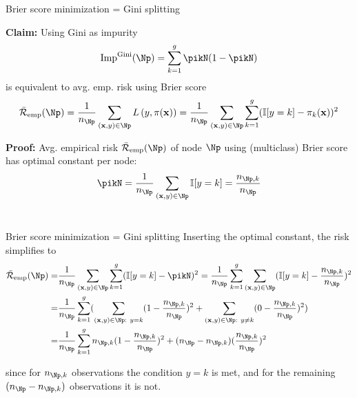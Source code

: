 \documentclass[11pt,compress,t,notes=noshow, xcolor=table]{beamer}
\begin{document}
\begin{frame}{Brier score minimization = Gini splitting}

\textbf{Claim:} Using Gini as impurity
$$\text{Imp}^{\text{Gini}}(\Np) = \sum_{k=1}^g \pikN (1-\pikN )$$
is equivalent to avg. emp. risk using Brier score 
$$\riskeb(\Np)= \frac{1}{n_\Np} \sum_{\xy \in \Np} \Lpixy = \frac{1}{n_\Np} \sum_{\xy \in \Np} \sum_{k = 1}^g (\I [y=k] - \pi_k(\xv))^2$$



\vfill

\textbf{Proof:} Avg. empirical risk $\riskeb(\Np)$ of node $\Np$ using (multiclass) Brier score has optimal constant per node: 
$$\pikN = \frac{1}{n_{\Np}} \sum\limits_{(\xv,y) \in \Np} \I [y=k] = \frac{n_{\Np,k}}{n_{\Np }}$$ \\

\vfill



\end{frame}
\begin{framev}[fs=small]{Brier score minimization = Gini splitting}
Inserting the optimal constant, the risk simplifies to
\begin{align*}
\riskeb(\Np) =& \frac{1}{n_\Np} \sum_{\xy \in \Np}  \sum_{k = 1}^g (\I [y=k] - \pikN)^2 
= \frac{1}{n_\Np} \sum_{k = 1}^g \sum_{\xy \in \Np} (\I [y=k] - \frac{n_{\Np,k}}{n_{\Np }})^2\\
=& \frac{1}{n_\Np} \sum_{k = 1}^{g} (\sum_{\xy \in \Np: ~ y = k} (1 - \frac{n_{\Np,k}}{n_{\Np }})^2 + \sum_{\xy \in \Np: ~ y \ne k} (0 - \frac{n_{\Np,k}}{n_{\Np }})^2) \\
=& \frac{1}{n_\Np} \sum_{k = 1}^g n_{\Np,k}(1 - \frac{n_{\Np,k}}{n_{\Np }})^2 + (n_{\Np } - n_{\Np,k})(\frac{n_{\Np,k}}{n_{\Np }})^2
\end{align*}

\vfill

since for $n_{\Np,k}$ observations the condition $y = k$ is met, and for the remaining $(n_\Np - n_{\Np,k})$ observations it is not. 

\end{framev}
\end{document}
